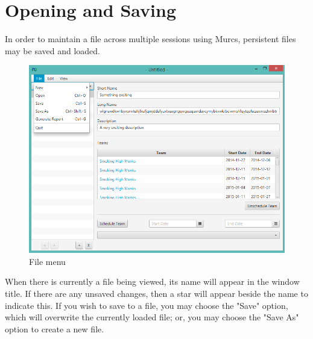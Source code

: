\section{Opening and Saving}

In order to maintain a file across multiple sessions using Murcs, persistent files may be saved and loaded.

\begin{figure}[H]
\centering
\includegraphics[width=\textwidth]{images/screenshots/file_menu.PNG}
\caption{File menu}
\label{fig:new_project}
\end{figure}

When there is currently a file being viewed, its name will appear in the window title. If there are any unsaved changes, then a star will appear beside the name to indicate this. If you wish to save to a file, you may choose the "Save" option, which will overwrite the currently loaded file; or, you may choose the "Save As" option to create a new file.